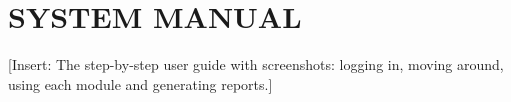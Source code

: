 \chapter{SYSTEM MANUAL}
[Insert: The step-by-step user guide with screenshots: logging in, moving around, using each module and generating reports.]
